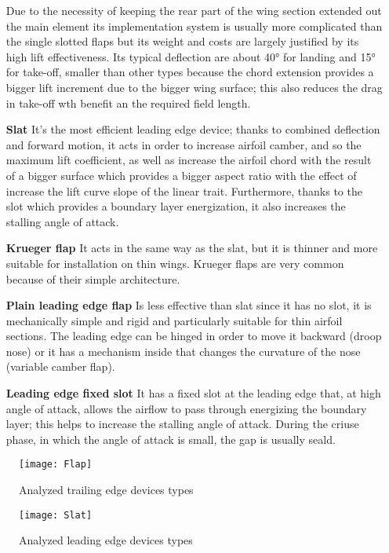 \begin{itemize}
Due to the necessity of keeping the rear part of the wing section extended out the main element its implementation system is usually more complicated than the single slotted flaps but its weight and costs are largely justified by its high lift effectiveness. Its typical deflection are about 40° for landing and 15° for take-off, smaller than other types because the chord extension provides a bigger lift increment due to the bigger wing surface; this also reduces the drag in take-off wth benefit an the required field length.
\item[\textbf{Slat}]  It's the most efficient leading edge device; thanks to combined deflection and forward motion, it acts in order to increase airfoil camber, and so the maximum lift coefficient, as well as increase the airfoil chord with the result of a bigger surface which provides a bigger aspect ratio with the effect of increase the lift curve slope of the linear trait. Furthermore, thanks to the slot which provides a boundary layer energization, it also increases the stalling angle of attack.
\item[\textbf{Krueger flap}]  It acts in the same way as the slat, but it is thinner and more suitable for installation on thin wings. Krueger flaps are very common because of their simple architecture.
\item[\textbf{Plain leading edge flap}] Is less effective than slat since it has no slot, it is mechanically simple and rigid and particularly suitable for thin airfoil sections. The leading edge can be hinged in order to move it backward (droop nose) or it has a mechanism inside that changes the curvature of the nose (variable camber flap).
\item[\textbf{Leading edge fixed slot}] It has a fixed slot at the leading edge that, at high angle of attack, allows the airflow to pass through energizing the boundary layer; this helps to increase the stalling angle of attack. During the criuse phase, in which the angle of attack is small, the gap is usually seald.
\end{itemize}

\begin{figure}[!t]
  \centering
  \texttt{[image: Flap]}
  \caption{Analyzed trailing edge devices types}
  \label{fig:FlapTypes}
\end{figure}

\begin{figure}[!t]
  \centering
  \texttt{[image: Slat]}
  \caption{Analyzed leading edge devices types}
  \label{fig:SlatTypes}
\end{figure}

